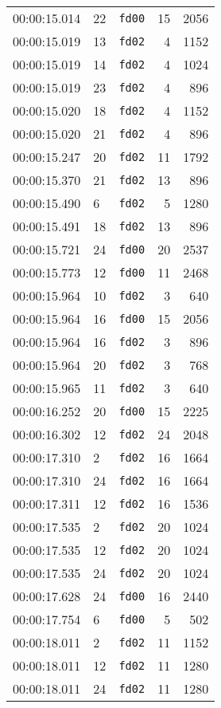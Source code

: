 \documentclass{article}
\begin{document}
\begin{longtable}{lllrr}
00:00:15.014 & 22 & \texttt{fd00} & 15 & 2056 \\
00:00:15.019 & 13 & \texttt{fd02} & 4 & 1152 \\
00:00:15.019 & 14 & \texttt{fd02} & 4 & 1024 \\
00:00:15.019 & 23 & \texttt{fd02} & 4 & 896 \\
00:00:15.020 & 18 & \texttt{fd02} & 4 & 1152 \\
00:00:15.020 & 21 & \texttt{fd02} & 4 & 896 \\
00:00:15.247 & 20 & \texttt{fd02} & 11 & 1792 \\
00:00:15.370 & 21 & \texttt{fd02} & 13 & 896 \\
00:00:15.490 & 6 & \texttt{fd02} & 5 & 1280 \\
00:00:15.491 & 18 & \texttt{fd02} & 13 & 896 \\
00:00:15.721 & 24 & \texttt{fd00} & 20 & 2537 \\
00:00:15.773 & 12 & \texttt{fd00} & 11 & 2468 \\
00:00:15.964 & 10 & \texttt{fd02} & 3 & 640 \\
00:00:15.964 & 16 & \texttt{fd00} & 15 & 2056 \\
00:00:15.964 & 16 & \texttt{fd02} & 3 & 896 \\
00:00:15.964 & 20 & \texttt{fd02} & 3 & 768 \\
00:00:15.965 & 11 & \texttt{fd02} & 3 & 640 \\
00:00:16.252 & 20 & \texttt{fd00} & 15 & 2225 \\
00:00:16.302 & 12 & \texttt{fd02} & 24 & 2048 \\
00:00:17.310 & 2 & \texttt{fd02} & 16 & 1664 \\
00:00:17.310 & 24 & \texttt{fd02} & 16 & 1664 \\
00:00:17.311 & 12 & \texttt{fd02} & 16 & 1536 \\
00:00:17.535 & 2 & \texttt{fd02} & 20 & 1024 \\
00:00:17.535 & 12 & \texttt{fd02} & 20 & 1024 \\
00:00:17.535 & 24 & \texttt{fd02} & 20 & 1024 \\
00:00:17.628 & 24 & \texttt{fd00} & 16 & 2440 \\
00:00:17.754 & 6 & \texttt{fd00} & 5 & 502 \\
00:00:18.011 & 2 & \texttt{fd02} & 11 & 1152 \\
00:00:18.011 & 12 & \texttt{fd02} & 11 & 1280 \\
00:00:18.011 & 24 & \texttt{fd02} & 11 & 1280 \\

\end{longtable}
\end{document}
